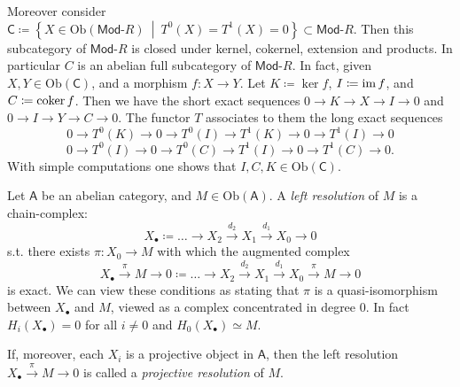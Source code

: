 \begin{ex}
	Moreover consider $\mathsf{C} \coloneqq \left\{ X \in \mathrm{Ob} \left(\mathsf{Mod}\text{-}R\right) \ \middle|\ 
	T^0(X) = T^1(X) = 0\right\} \subset \mathsf{Mod}\text{-}R$.
	Then this subcategory of $\mathsf{Mod}\text{-}R$ is closed under
	kernel, cokernel, extension and products.
	In particular $C$ is an abelian full subcategory of $\mathsf{Mod}\text{-}R$.
	In fact, given $X, Y \in \mathrm{Ob} \left(\mathsf{C}\right)$, and a morphism $f\colon X \to Y$.
	Let $K \coloneqq \ker f$, $I \coloneqq \operatorname{im} f$, and $C \coloneqq \operatorname{coker} f$.
	Then we have the short exact sequences
	$0 \to K \to X \to I \to 0$ and $0 \to I \to Y \to C \to 0$.
	The functor $T$ associates to them the long exact sequences
	\begin{equation}
		0 \to T^0(K) \to 0 \to T^0(I) \to
		T^1(K) \to 0 \to T^1(I) \to 0
	\end{equation} 
	\begin{equation}
		0 \to T^0(I) \to 0 \to T^0(C) \to
		T^1(I) \to 0 \to T^1(C) \to 0
	.\end{equation} 
	With simple computations one shows that $I, C, K \in \mathrm{Ob} \left(\mathsf{C}\right)$.
\end{ex} 

\begin{defn}
	Let $\mathsf{A}$ be an abelian category, and $M \in \mathrm{Ob} \left(\mathsf{A}\right)$.
	A {\em left resolution} of $M$ is a chain-complex:
	\begin{equation}
		X_{\bullet} \coloneqq \ldots \to X_2 \xrightarrow{d_2} X_1 \xrightarrow{d_1} X_0 \to 0
	\end{equation} 
	s.t. there exists $\pi\colon X_0 \to M$ with which the augmented complex
	\begin{equation}
	X_{\bullet} \xrightarrow{\pi} M \to 0 \coloneqq \ldots \to X_2 \xrightarrow{d_2} 
	X_1 \xrightarrow{d_1} X_0 \xrightarrow{\pi} M \to 0
	\end{equation} 
	is exact.
	We can view these conditions as stating that $\pi$
	is a quasi-isomorphism between $X_{\bullet}$ and $M$,
	viewed as a complex concentrated in degree $0$.
	In fact $H_i(X_{\bullet}) = 0$ for all $i \neq 0$
	and $H_0(X_{\bullet}) \simeq M$.

	If, moreover, each $X_i$ is a projective object in $\mathsf{A}$, then
	the left resolution $X_{\bullet} \xrightarrow{\pi} M \to 0$ is called a
	{\em projective resolution} of $M$.
\end{defn}

